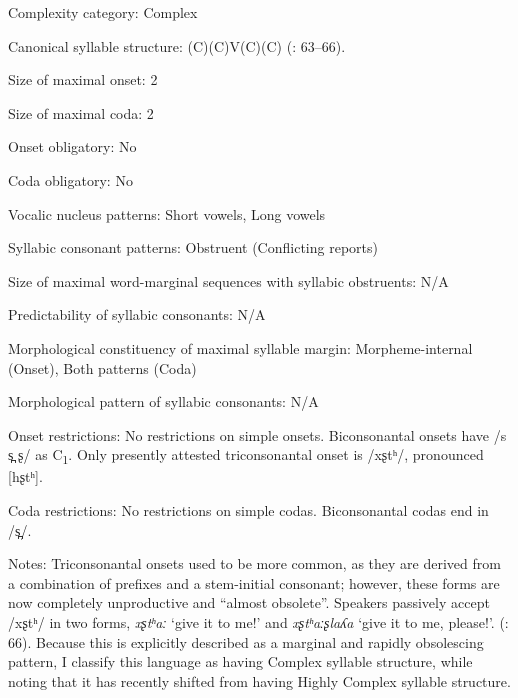 {\begin{appendixdesc}
\item[Complexity category:] Complex

\item[Canonical syllable structure:] (C)(C)V(C)(C) (\citealt{Cerrón-Palomino2006}: 63--66).

\item[Size of maximal onset:] 2

\item[Size of maximal coda:] 2

\item[Onset obligatory:] No

\item[Coda obligatory:] No

\item[Vocalic nucleus patterns:] Short vowels, Long vowels

\item[Syllabic consonant patterns:] Obstruent (Conflicting reports)

\item[Size of maximal word-marginal sequences with syllabic obstruents:] N/A

\item[Predictability of syllabic consonants:] N/A

\item[Morphological constituency of maximal syllable margin:] Morpheme-internal (Onset), Both patterns (Coda)

\item[Morphological pattern of syllabic consonants:] N/A

\item[Onset restrictions:] No restrictions on simple onsets. Biconsonantal onsets have /s s̪ ʂ/ as C\textsubscript{1}. Only presently attested triconsonantal onset is /xʂtʰ/, pronounced [hʂtʰ].

\item[Coda restrictions:] No restrictions on simple codas. Biconsonantal codas end in /s̪/.

\item[Notes:] Triconsonantal onsets used to be more common, as they are derived from a combination of prefixes and a stem-initial consonant; however, these forms are now completely unproductive and “almost obsolete”. Speakers passively accept /xʂtʰ/ in two forms, \textit{xʂtʰaː} ‘give it to me!’ and \textit{xʂtʰaːʂlaʎa} ‘give it to me, please!’. (\citealt{Cerrón-Palomino2006}: 66). Because this is explicitly described as a marginal and rapidly obsolescing pattern, I classify this language as having Complex syllable structure, while noting that it has recently shifted from having Highly Complex syllable structure.
\end{appendixdesc}
}
